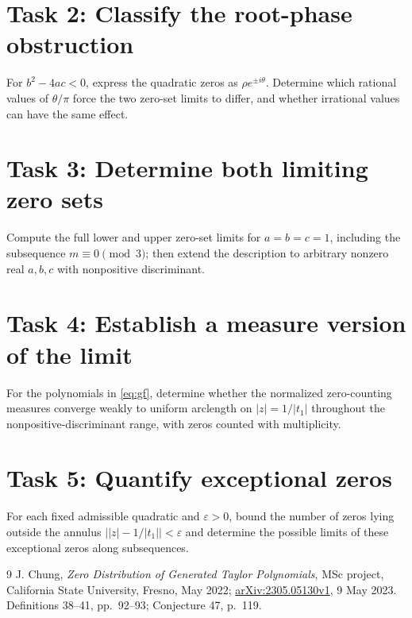 \documentclass[11pt]{article}
\begin{document}
\section*{Task 2: Classify the root-phase obstruction}
For $b^2-4ac<0$, express the quadratic zeros as $\rho e^{\pm i\theta}$.
Determine which rational values of $\theta/\pi$ force the two zero-set
limits to differ, and whether irrational values can have the same effect.

\section*{Task 3: Determine both limiting zero sets}
Compute the full lower and upper zero-set limits for $a=b=c=1$, including
the subsequence $m\equiv0\pmod3$; then extend the description to arbitrary
nonzero real $a,b,c$ with nonpositive discriminant.

\section*{Task 4: Establish a measure version of the limit}
For the polynomials in \eqref{eq:gf}, determine whether the normalized
zero-counting measures converge weakly to uniform arclength on
$|z|=1/|t_1|$ throughout the nonpositive-discriminant range, with zeros
counted with multiplicity.

\section*{Task 5: Quantify exceptional zeros}
For each fixed admissible quadratic and $\varepsilon>0$, bound the number
of zeros lying outside the annulus
$\bigl||z|-1/|t_1|\bigr|<\varepsilon$ and determine the possible limits
of these exceptional zeros along subsequences.

\begin{thebibliography}{9}
 J. Chung, \emph{Zero Distribution of Generated Taylor
Polynomials}, MSc project, California State University, Fresno, May 2022;
\href{https://arxiv.org/abs/2305.05130}{arXiv:2305.05130v1}, 9 May 2023.
Definitions 38--41, pp.~92--93; Conjecture 47, p.~119.
\end{thebibliography}
\end{document}
